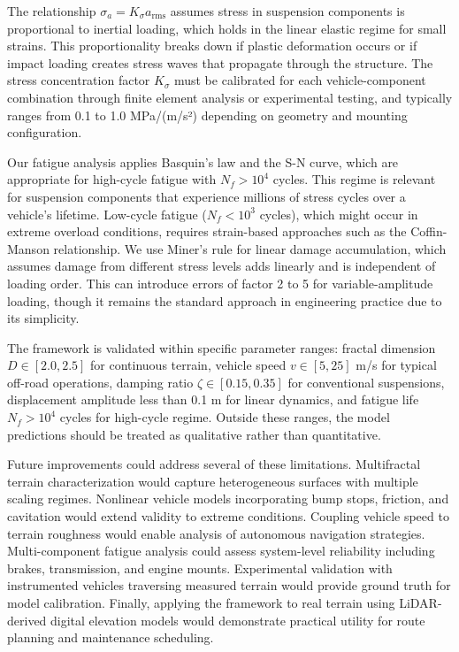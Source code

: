 \documentclass[11pt]{article}
\begin{document}
The relationship $\sigma_a = K_\sigma a_{\text{rms}}$ assumes stress in suspension components is proportional to inertial loading, which holds in the linear elastic regime for small strains. This proportionality breaks down if plastic deformation occurs or if impact loading creates stress waves that propagate through the structure. The stress concentration factor $K_\sigma$ must be calibrated for each vehicle-component combination through finite element analysis or experimental testing, and typically ranges from 0.1 to 1.0 MPa/(m/s²) depending on geometry and mounting configuration.

Our fatigue analysis applies Basquin's law and the S-N curve, which are appropriate for high-cycle fatigue with $N_f > 10^4$ cycles. This regime is relevant for suspension components that experience millions of stress cycles over a vehicle's lifetime. Low-cycle fatigue ($N_f < 10^3$ cycles), which might occur in extreme overload conditions, requires strain-based approaches such as the Coffin-Manson relationship. We use Miner's rule for linear damage accumulation, which assumes damage from different stress levels adds linearly and is independent of loading order. This can introduce errors of factor 2 to 5 for variable-amplitude loading, though it remains the standard approach in engineering practice due to its simplicity.

The framework is validated within specific parameter ranges: fractal dimension $D \in [2.0, 2.5]$ for continuous terrain, vehicle speed $v \in [5, 25]$ m/s for typical off-road operations, damping ratio $\zeta \in [0.15, 0.35]$ for conventional suspensions, displacement amplitude less than 0.1 m for linear dynamics, and fatigue life $N_f > 10^4$ cycles for high-cycle regime. Outside these ranges, the model predictions should be treated as qualitative rather than quantitative.

Future improvements could address several of these limitations. Multifractal terrain characterization would capture heterogeneous surfaces with multiple scaling regimes. Nonlinear vehicle models incorporating bump stops, friction, and cavitation would extend validity to extreme conditions. Coupling vehicle speed to terrain roughness would enable analysis of autonomous navigation strategies. Multi-component fatigue analysis could assess system-level reliability including brakes, transmission, and engine mounts. Experimental validation with instrumented vehicles traversing measured terrain would provide ground truth for model calibration. Finally, applying the framework to real terrain using LiDAR-derived digital elevation models would demonstrate practical utility for route planning and maintenance scheduling.
\end{document}
